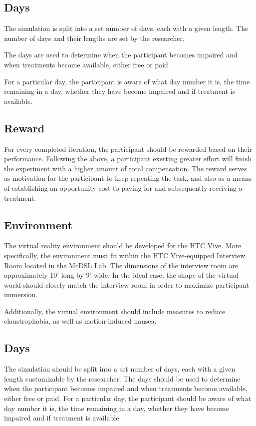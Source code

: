 \documentclass{article}
\begin{document}
\subsection{Days}

The simulation is split into a set number of days, each with a given length. The number of days and their lengths are set by the researcher.

The days are used to determine when the participant becomes impaired and when treatments become available, either free or paid.

For a particular day, the participant is aware of what day number it is, the time remaining in a day, whether they have become impaired and if treatment is available.

\subsection{Reward}
For every completed iteration, the participant should be rewarded based on their performance. Following the above, a participant exerting greater effort will finish the experiment with a higher amount of total compensation. The reward serves as motivation for the participant to keep repeating the task, and also as a means of establishing an opportunity cost to paying for and subsequently receiving a treatment. 


\subsection{Environment}
The virtual reality environment should be developed for the HTC Vive. More specifically, the environment must fit within the HTC Vive-equipped Interview Room located in the McDSL Lab. The dimensions of the interview room are approximately 10’ long by 9’ wide. In the ideal case, the shape of the virtual world should closely match the interview room in order to maximize participant immersion.

Additionally, the virtual environment should include measures to reduce claustrophobia, as well as motion-induced nausea.

\subsection{Days}
The simulation should be split into a set number of days, each with a given length customizable by the researcher. The days should be used to determine when the participant becomes impaired and when treatments become available, either free or paid. For a particular day, the participant should be aware of what day number it is, the time remaining in a day, whether they have become impaired and if treatment is available.
\end{document}
